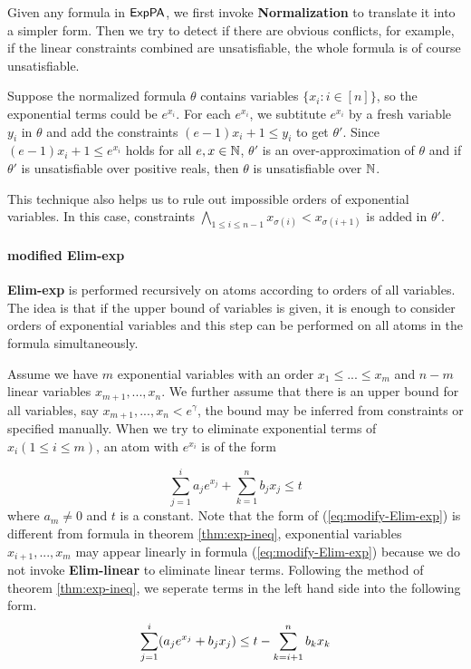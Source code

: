 Given any formula in ${\sf ExpPA}$, we first invoke \textbf{Normalization} to translate it into a simpler form. Then we  try to detect if there are obvious conflicts, for example, if the linear constraints combined are unsatisfiable, the whole formula is of course unsatisfiable.

Suppose the normalized formula $\theta$ contains variables $\{x_i:i\in[n]\}$, so the exponential terms could be $e^{x_i}$. For each $e^{x_i}$, we subtitute $e^{x_i}$ by a fresh variable $y_i$ in $\theta$ and add the constraints $(e-1)x_i+1\le y_i$ to get $\theta'$. Since $(e-1)x_i+1\le e^{x_i}$ holds for all $e,x\in \mathbb{N}$, $\theta'$ is an over-approximation of $\theta$ and if $\theta'$ is unsatisfiable over positive reals, then $\theta$ is unsatisfiable over $\mathbb{N}$.

This technique also helps us to rule out impossible orders of exponential variables. In this case, constraints $\bigwedge_{1\le i\le n-1} x_{\sigma(i)}<x_{\sigma(i+1)}$ is added in $\theta'$.

\paragraph{modified \textbf{Elim-exp}}\label{para: modified Elim-exp}

\textbf{Elim-exp} is performed recursively on atoms according to orders of all variables. The idea is that if the upper bound of variables is given, it is enough to consider orders of exponential variables and this step can be performed on all atoms in the formula simultaneously.

Assume we have $m$ exponential variables with an order $x_1\le ...\le x_m$ and $n-m$ linear variables $x_{m+1},...,x_n$. We further assume that there is an upper bound for all variables, say $x_{m+1},...,x_n< e^\gamma$, the bound may be inferred from constraints or specified manually. When we try to eliminate exponential terms of $x_i(1\le i\le m)$, an atom with $e^{x_i}$ is of the form 

\begin{equation}\label{eq:modify-Elim-exp}
    \sum_{j=1}^i a_j e^{x_j}+\sum_{k=1}^n b_j x_j\le t 
\end{equation}
where $a_m\neq 0$ and $t$ is a constant. Note that the form of (\ref{eq:modify-Elim-exp}) is different from formula in theorem \ref{thm:exp-ineq}, exponential variables $x_{i+1},...,x_{m}$ may appear linearly in formula (\ref{eq:modify-Elim-exp}) because we do not invoke \textbf{Elim-linear} to eliminate linear terms. Following the method of theorem \ref{thm:exp-ineq}, we seperate terms in the left hand side into the following form.
\begin{equation}
    \sum_{j=1}^i (a_j e^{x_j} + b_j x_j) \le t -\sum_{k=i+1}^n b_k x_k \notag
\end{equation}

